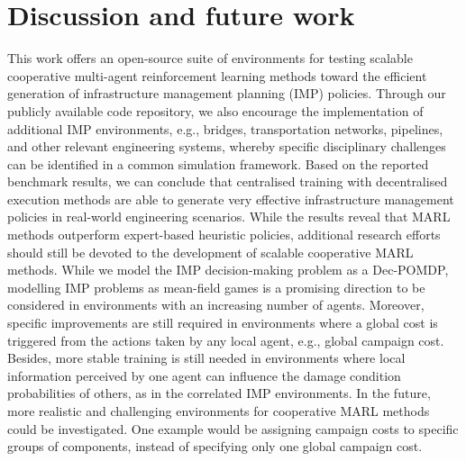 \section{Discussion and future work}\label{sec:ch5_discusconclu}
This work offers an open-source suite of environments for testing scalable cooperative multi-agent reinforcement learning methods toward the efficient generation of infrastructure management planning (IMP) policies.
Through our publicly available code repository, we also encourage the implementation of additional IMP environments, e.g., bridges, transportation networks, pipelines, and other relevant engineering systems, whereby specific disciplinary challenges can be identified in a common simulation framework.
Based on the reported benchmark results, we can conclude that centralised training with decentralised execution methods are able to generate very effective infrastructure management policies in real-world engineering scenarios.
While the results reveal that MARL methods outperform expert-based heuristic policies, additional research efforts should still be devoted to the development of scalable cooperative MARL methods.
While we model the IMP decision-making problem as a Dec-POMDP, modelling IMP problems as mean-field games \citep{lauriere2022learning} is a promising direction to be considered in environments with an increasing number of agents.
Moreover, specific improvements are still required in environments where a global cost is triggered from the actions taken by any local agent, e.g., global campaign cost.
Besides, more stable training is still needed in environments where local information perceived by one agent can influence the damage condition probabilities of others, as in the correlated IMP environments.
In the future, more realistic and challenging environments for cooperative MARL methods could be investigated.
One example would be assigning campaign costs to specific groups of components, instead of specifying only one global campaign cost.
